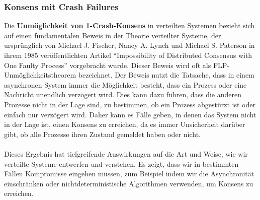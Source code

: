 
\subsubsection{Konsens mit Crash Failures}
Die \textbf{Unmöglichkeit von 1-Crash-Konsens} in verteilten Systemen bezieht sich auf einen fundamentalen Beweis in der Theorie verteilter Systeme, der ursprünglich von Michael J. Fischer, Nancy A. Lynch und Michael S. Paterson in ihrem 1985 veröffentlichten Artikel \enquote{Impossibility of Distributed Consensus with One Faulty Process} vorgebracht wurde. Dieser Beweis wird oft als FLP-Unmöglichkeitstheorem bezeichnet.
Der Beweis nutzt die Tatsache, dass in einem asynchronen System immer die Möglichkeit besteht, dass ein Prozess oder eine Nachricht unendlich verzögert wird. Dies kann dazu führen, dass die anderen Prozesse nicht in der Lage sind, zu bestimmen, ob ein Prozess abgestürzt ist oder einfach nur verzögert wird. Daher kann es Fälle geben, in denen das System nicht in der Lage ist, einen Konsens zu erreichen, da es immer Unsicherheit darüber gibt, ob alle Prozesse ihren Zustand gemeldet haben oder nicht.
\\\\
Dieses Ergebnis hat tiefgreifende Auswirkungen auf die Art und Weise, wie wir verteilte Systeme entwerfen und verstehen. Es zeigt, dass wir in bestimmten Fällen Kompromisse eingehen müssen, zum Beispiel indem wir die Asynchronität einschränken oder nichtdeterministische Algorithmen verwenden, um Konsens zu erreichen.


